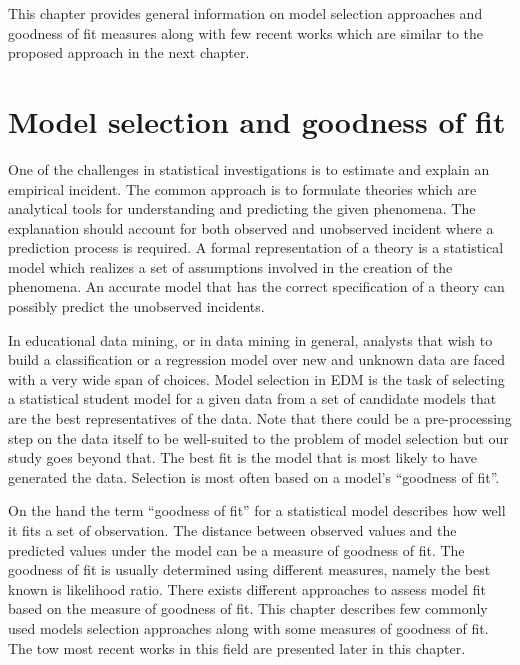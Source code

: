 \label{sec:RelatedWorks}

This chapter provides general information on model selection approaches and goodness of fit measures along with few recent works which are similar to the proposed approach in the next chapter. 


\section{Model selection and goodness of fit}
One of the challenges in statistical investigations is to estimate and explain an empirical incident. The common approach is to formulate theories which are analytical tools for understanding and predicting the given phenomena. The explanation should account for both observed and unobserved incident where a prediction process is required. A formal representation of a theory is a statistical model which realizes a set of assumptions involved in the creation of the phenomena. An accurate model that has the correct specification of a theory can possibly predict the unobserved incidents.

In educational data mining, or in data mining in general, analysts that wish to build a classification or a regression model over new and unknown data are faced with a very wide span of choices. Model selection in EDM is the task of selecting a statistical student model for a given data from a set of candidate models that are the best representatives of the data. Note that there could be a pre-processing step on the data itself to be well-suited to the problem of model selection but our study goes beyond that. The best fit is the model that is most likely to have generated the data. Selection is most often based on a model's ``goodness of fit''.

On the hand the term ``goodness of fit''  for a statistical model describes how well it fits a set of observation. The distance between observed values and the predicted values under the model can be a measure of goodness of fit. The goodness of fit is usually determined using different measures, namely the best known is likelihood ratio. There exists different approaches to assess model fit based on the measure of goodness of fit. This chapter describes few commonly used models selection approaches along with some measures of goodness of fit. The tow most recent works \citep{Desmarais2010,Rosenberg2015} in this field are presented later in this chapter.

